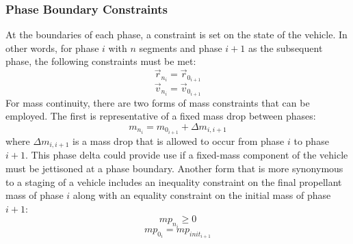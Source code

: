 \subsubsection{Phase Boundary Constraints}
At the boundaries of each phase, a constraint is set on the state of the vehicle. In other words, for phase $i$ with $n$ segments and phase $i+1$ as the subsequent phase, the following constraints must be met:
\begin{equation}
\vec{r}_{n_{i}} = \vec{r}_{0_{i+1}}
\end{equation}
\begin{equation}
\vec{v}_{n_{i}} = \vec{v}_{0_{i+1}}
\end{equation}
For mass continuity, there are two forms of mass constraints that can be employed. The first is representative of a fixed mass drop between phases:
\begin{equation}
m_{n_{i}} = m_{0_{i+1}} + \Delta m_{i,i+1}
\end{equation}
where $\Delta m_{i,i+1}$ is a mass drop that is allowed to occur from phase $i$ to phase $i+1$. This phase delta could provide use if a fixed-mass component of the vehicle must be jettisoned at a phase boundary. Another form that is more synonymous to a staging of a vehicle includes an inequality constraint on the final propellant mass of phase $i$ along with an equality constraint on the initial mass of phase $i+1$:
\begin{equation}
mp_{n_{i}} \geq 0
\end{equation}
\begin{equation}
mp_{0_{i}} = mp_{\mathit{init}_{i+1}}
\end{equation}


